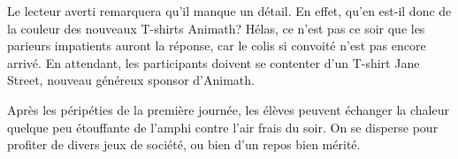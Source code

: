 Le lecteur averti remarquera qu’il manque un détail. En effet, qu’en est-il donc de la couleur des nouveaux T-shirts Animath? Hélas, ce n’est pas ce soir que les parieurs impatients auront la réponse, car le colis si convoité n’est pas encore arrivé. En attendant, les participants doivent se contenter d’un T-shirt Jane Street, nouveau généreux sponsor d’Animath.

Après les péripéties de la première journée, les élèves peuvent échanger la chaleur quelque peu étouffante de l’amphi contre l’air frais du soir. On se disperse pour profiter de divers jeux de société, ou bien d’un repos bien mérité.